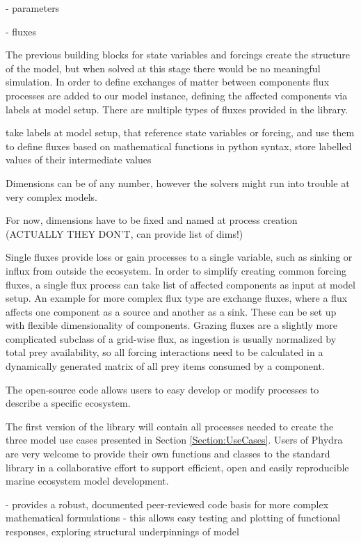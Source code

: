 \documentclass[journal abbreviation, manuscript]{copernicus}
\begin{document}
- parameters

- fluxes

The previous building blocks for state variables and forcings create the structure of the model, but when solved at this stage there would be no meaningful simulation. In order to define exchanges of matter between components flux processes are added to our model instance, defining the affected components via labels at model setup.
There are multiple types of fluxes provided in the library. 

take labels at model setup, that reference state variables or forcing, and use them to define fluxes based on mathematical functions in python syntax, store labelled values of their intermediate values

Dimensions can be of any number, however the solvers might run into trouble at very complex models. 

For now, dimensions have to be fixed and named at process creation (ACTUALLY THEY DON'T, can provide list of dims!)

Single fluxes provide loss or gain processes to a single variable, such as sinking or influx from outside the ecosystem. In order to simplify creating common forcing fluxes, a single flux process can take list of affected components as input at model setup. An example for more complex flux type are exchange fluxes, where a flux affects one component as a source and another as a sink. These can be set up with flexible dimensionality of components. Grazing fluxes are a slightly more complicated subclass of a grid-wise flux, as ingestion is usually normalized by total prey availability, so all forcing interactions need to be calculated in a dynamically generated matrix of all prey items consumed by a component.


The open-source code allows users to easy develop or modify processes to describe a specific ecosystem.

The first version of the library will contain all processes needed to create the three model use cases presented in Section \ref{Section:UseCases}. Users of Phydra are very welcome to provide their own functions and classes to the standard library in a collaborative effort to support efficient, open and easily reproducible marine ecosystem model development.

- provides a robust, documented peer-reviewed code basis for more complex mathematical formulations
- this allows easy testing and plotting of functional responses, exploring structural underpinnings of model
\end{document}
